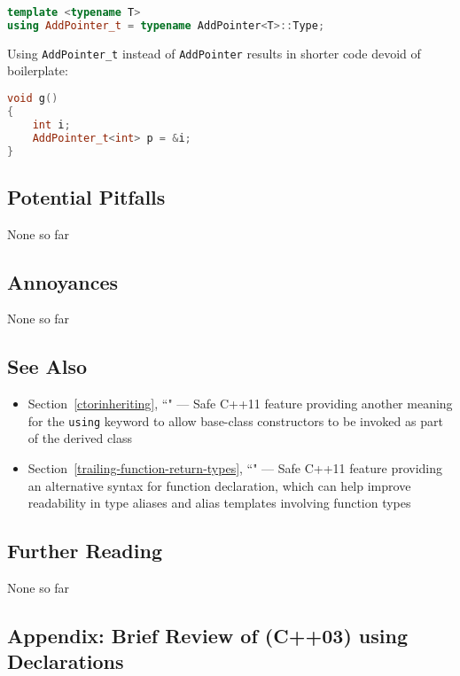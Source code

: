 \begin{lstlisting}[language=C++]
template <typename T>
using AddPointer_t = typename AddPointer<T>::Type;
\end{lstlisting}
    
\noindent Using \texttt{AddPointer\_t} instead of \texttt{AddPointer} results in
shorter code devoid of boilerplate:

\begin{lstlisting}[language=C++]
void g()
{
    int i;
    AddPointer_t<int> p = &i;
}
\end{lstlisting}
    

\subsection[Potential Pitfalls]{Potential Pitfalls}\label{potential-pitfalls}

None so far

\subsection[Annoyances]{Annoyances}\label{annoyances}

None so far

\subsection[See Also]{See Also}\label{see-also}

\begin{itemize}
\item{Section~\ref{ctorinheriting}, ``" — Safe C++11 feature providing another meaning for the \texttt{using} keyword to allow base-class constructors to be invoked as part of the derived class}
\item{Section~\ref{trailing-function-return-types}, ``" — Safe C++11 feature providing an alternative syntax for function declaration, which can help improve readability in type aliases and alias templates involving function types}
\end{itemize}

\subsection[Further Reading]{Further Reading}\label{further-reading}

None so far

\subsection[Appendix: Brief Review of (C++03) {\tt using} Declarations]{Appendix: Brief Review of (C++03) {\SubsecCode using} Declarations}\label{appendix:-brief-review-of-(c++03)-using-declarations}

